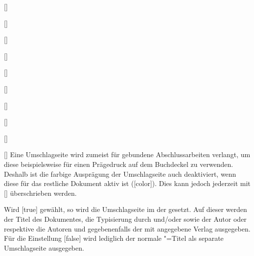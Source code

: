 \begin{Declaration}{}
\begin{Declaration}[v2.02]{%
  []%
}
\begin{Declaration}{[\PBoolean]}
\begin{Declaration}[v2.02]{[\PSet]}{%
}
\begin{Declaration}[v2.03]{[\PSet]}{%
}
\begin{Declaration}[v2.03]{[\PSet]}{%
}
\begin{Declaration}[v2.03]{%
  []%
}{}
\begin{Declaration}[v2.03]{%
  []
}{}
\begin{Declaration}[v2.03]{[\PSet]}{%
}
\begin{Declaration}[v2.03]{[\PSet]}{%
}
\begin{Declaration}[v2.03]{[\PSet]}{%
}
\printdeclarationlist%
%
Eine Umschlagseite wird zumeist für gebundene Abschlussarbeiten verlangt, um 
diese beispielsweise für einen Prägedruck auf dem Buchdeckel zu verwenden. 
Deshalb ist die farbige Ausprägung der Umschlagseite auch deaktiviert, wenn 
diese für das restliche Dokument aktiv ist ([color]). Dies kann 
jedoch jederzeit mit [\PSet] überschrieben werden.

Wird [true] gewählt, so wird die Umschlagseite im \CD der 
\TnUD gesetzt. Auf dieser werden der Titel des Dokumentes, die Typisierung 
durch  und/oder  sowie der Autor oder respektive 
die Autoren und gegebenenfalls der mit  angegebene Verlag 
ausgegeben.
Für die Einstellung [false] wird lediglich der normale 
\KOMAScript"=Titel als separate Umschlagseite ausgegeben. 


\end{Declaration}
\end{Declaration}
\end{Declaration}
\end{Declaration}
\end{Declaration}
\end{Declaration}
\end{Declaration}
\end{Declaration}
\end{Declaration}
\end{Declaration}
\end{Declaration}
